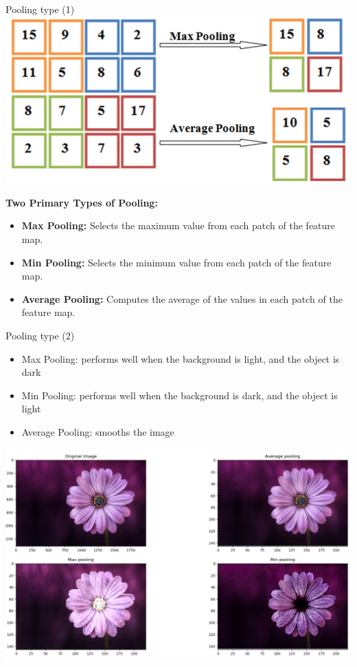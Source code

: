\documentclass[default, aspectratio=169]{beamer}
\begin{document}
	\begin{frame}{Pooling type (1)}
		\centering
		\includegraphics[keepaspectratio, scale=0.5]{pic/pooling2.png}
		\begin{flushleft}
			\textbf{Two Primary Types of Pooling:}
			\begin{itemize}		
				\item \textbf{Max Pooling:}  \small Selects the maximum value from each patch of the feature map.
				\item \textbf{Min Pooling:}  \small Selects the minimum value from each patch of the feature map.
				\item \textbf{Average Pooling:} \small Computes the average of the values in each patch of the feature map.
			\end{itemize}
		\end{flushleft}
	\end{frame}
	
	\begin{frame}{Pooling type (2)}
		\begin{itemize}
			\item Max Pooling: performs well when the background is light, and the object is dark
			\item Min Pooling: performs well when the background is dark, and the object is light
			\item Average Pooling: smooths the image
		\end{itemize}
		
		\centering
		\includegraphics[keepaspectratio, scale=0.15]{pic/Pooling_3.png}
	\end{frame}
	
\end{document}
